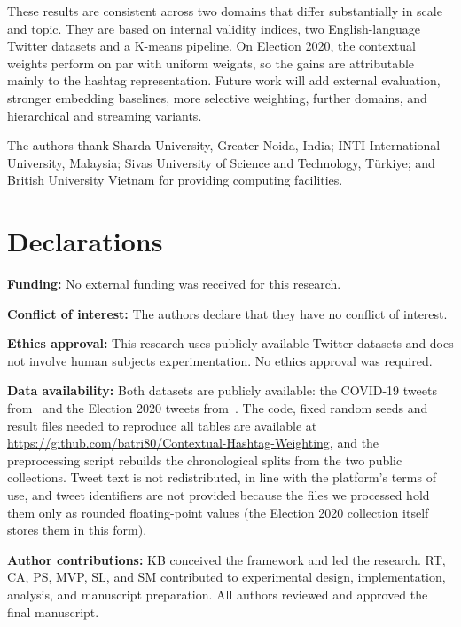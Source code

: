 \documentclass[pdflatex,sn-mathphys-num]{sn-jnl}%
\begin{document}
These results are consistent across two domains that differ substantially in scale and topic. They are based on internal validity indices, two English-language Twitter datasets and a K-means pipeline. On Election 2020, the contextual weights perform on par with uniform weights, so the gains are attributable mainly to the hashtag representation. Future work will add external evaluation, stronger embedding baselines, more selective weighting, further domains, and hierarchical and streaming variants.


\backmatter


The authors thank Sharda University, Greater Noida, India; INTI International University, Malaysia; Sivas University of Science and Technology, Türkiye; and British University Vietnam for providing computing facilities.

\section*{Declarations}

\textbf{Funding:} No external funding was received for this research.

\textbf{Conflict of interest:} The authors declare that they have no conflict of interest.

\textbf{Ethics approval:} This research uses publicly available Twitter datasets and does not involve human subjects experimentation. No ethics approval was required.

\textbf{Data availability:} Both datasets are publicly available: the COVID-19 tweets from~\cite{covid_kaggle} and the Election 2020 tweets from~\cite{election_kaggle}. The code, fixed random seeds and result files needed to reproduce all tables are available at \url{https://github.com/batri80/Contextual-Hashtag-Weighting}, and the preprocessing script rebuilds the chronological splits from the two public collections. Tweet text is not redistributed, in line with the platform's terms of use, and tweet identifiers are not provided because the files we processed hold them only as rounded floating-point values (the Election 2020 collection itself stores them in this form).

\textbf{Author contributions:} KB conceived the framework and led the research. RT, CA, PS, MVP, SL, and SM contributed to experimental design, implementation, analysis, and manuscript preparation. All authors reviewed and approved the final manuscript.



\end{document}
